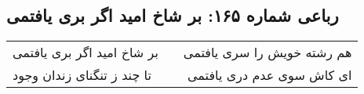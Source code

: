 \begin{center}
\section*{رباعی شماره ۱۶۵: بر شاخ امید اگر بری یافتمی}
\label{sec:sh165}
\begin{longtable}{l p{0.5cm} r}
بر شاخ امید اگر بری یافتمی
&&
هم رشته خویش را سری یافتمی
\\
تا چند ز تنگنای زندان وجود
&&
ای کاش سوی عدم دری یافتمی
\\
\end{longtable}
\end{center}
